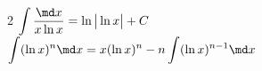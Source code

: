 \begin{multicols}{2}
    \(\displaystyle \int \dfrac{\md x}{x \ln x} =\ln \big | \ln x \big |+C\) \\
    \(\displaystyle \int (\ln x)^{n} \md x = x(\ln x)^ n - n \int (\ln x)^{n-1} \md x\)
\end{multicols}
